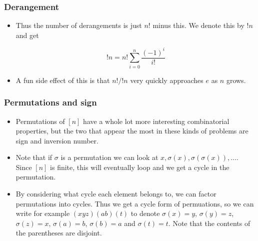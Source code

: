 \documentclass{beamer}
\begin{document}
\begin{frame}[plain]
\frametitle{Derangement}

\begin{itemize}

\item Thus the number of derangements is just $n!$ minus this. We denote this by $!n$ and get

\[!n = n!\sum_{i = 0}^n \frac{(-1)^i}{i!}\]

\item A fun side effect of this is that $n!/!n$ very quickly approaches $e$ as $n$ grows.

\end{itemize}

\end{frame}

\begin{frame}[plain]
\frametitle{Permutations and sign}

\begin{itemize}

\item Permutations of $[n]$ have a whole lot more interesting combinatorial properties, but the two that appear the most in these kinds of problems are sign and inversion number.

\item Note that if $\sigma$ is a permutation we can look at $x, \sigma(x), \sigma(\sigma(x)), \dots$. Since $[n]$ is finite, this will eventually loop and we get a cycle in the permutation.

\item By considering what cycle each element belongs to, we can factor permutations into cycles. Thus we get a cycle form of permuations, so we can write for example $(x y z)(a b)(t)$ to denote $\sigma(x) = y$, $\sigma(y) = z$, $\sigma(z) = x$, $\sigma(a) = b$, $\sigma(b) = a$ and $\sigma(t) = t$. Note that the contents of the parentheses are disjoint.

\end{itemize}

\end{frame}
\end{document}
